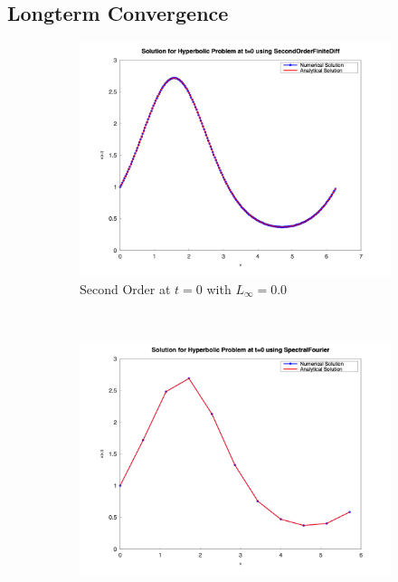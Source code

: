 \subsection{Longterm Convergence}

\begin{figure}[H]
	\centering
	\begin{subfigure}{0.5\textwidth}
		\includegraphics[width=\textwidth]{media/hyperbolic_SecondOrderFiniteDiff_0.png}
		\caption{Second Order at $t=0$ with $L_\infty=0.0$}
		\label{sfig:sublabel1}
	\end{subfigure}%
	~
	\begin{subfigure}{0.5\textwidth}
		\includegraphics[width=\textwidth]{media/hyperbolic_SpectralFourier_0.png}

\end{subfigure}
\end{figure}
